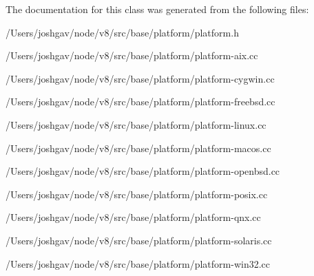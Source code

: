 The documentation for this class was generated from the following files\+:\begin{DoxyCompactItemize}
\item 
/\+Users/joshgav/node/v8/src/base/platform/platform.\+h\item 
/\+Users/joshgav/node/v8/src/base/platform/platform-\/aix.\+cc\item 
/\+Users/joshgav/node/v8/src/base/platform/platform-\/cygwin.\+cc\item 
/\+Users/joshgav/node/v8/src/base/platform/platform-\/freebsd.\+cc\item 
/\+Users/joshgav/node/v8/src/base/platform/platform-\/linux.\+cc\item 
/\+Users/joshgav/node/v8/src/base/platform/platform-\/macos.\+cc\item 
/\+Users/joshgav/node/v8/src/base/platform/platform-\/openbsd.\+cc\item 
/\+Users/joshgav/node/v8/src/base/platform/platform-\/posix.\+cc\item 
/\+Users/joshgav/node/v8/src/base/platform/platform-\/qnx.\+cc\item 
/\+Users/joshgav/node/v8/src/base/platform/platform-\/solaris.\+cc\item 
/\+Users/joshgav/node/v8/src/base/platform/platform-\/win32.\+cc\end{DoxyCompactItemize}
